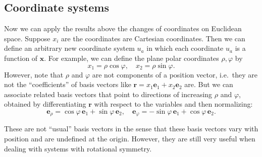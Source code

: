 \documentclass[a4paper]{article}
\begin{document}
\subsection{Coordinate systems}
Now we can apply the results above the changes of coordinates on Euclidean space. Suppose $x_i$ are the coordinates are Cartesian coordinates. Then we can define an arbitrary new coordinate system $u_a$ in which each coordinate $u_a$ is a function of $\mathbf{x}$. For example, we can define the plane polar coordinates $\rho, \varphi$ by
\[
  x_1 = \rho\cos\varphi, \quad x_2 = \rho\sin \varphi.
\]
However, note that $\rho$ and $\varphi$ are not components of a position vector, i.e.\ they are not the ``coefficients'' of basis vectors like $\mathbf{r} = x_1\mathbf{e}_1 + x_2\mathbf{e}_2$ are. But we can associate related basis vectors that point to directions of increasing $\rho$ and $\varphi$, obtained by differentiating $\mathbf{r}$ with respect to the variables and then normalizing:
\[
  \mathbf{e}_\rho = \cos \varphi\, \mathbf{e}_1 + \sin \varphi\, \mathbf{e}_2,\quad \mathbf{e}_\varphi = -\sin \varphi\, \mathbf{e}_1 + \cos \varphi\, \mathbf{e}_2.
\]
\begin{center}
\end{center}
These are not ``usual'' basis vectors in the sense that these basis vectors vary with position and are undefined at the origin. However, they are still very useful when dealing with systems with rotational symmetry.
\end{document}
